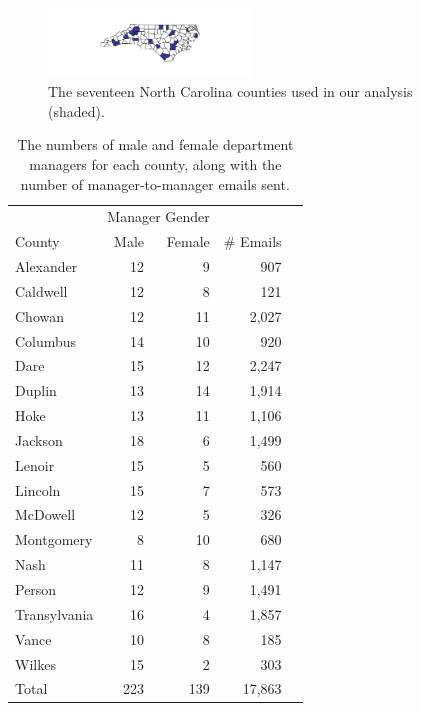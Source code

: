 \documentclass{pnastwo}
\begin{document}
\begin{article}
\begin{figure}
  \centering
  \caption{\label{fig:nc map}The seventeen North Carolina counties
    used in our analysis (shaded).} \centering
  \includegraphics[width=0.48\textwidth]{images/County_Map.pdf}
\end{figure}

\begin{table}
  \centering
  \begin{tabular}{lrrrr}
    \toprule
    & \multicolumn{2}{c}{Manager Gender} & \\
    \cmidrule{2-3}
    County & Male & Female & \# Emails  \\
    \midrule
    Alexander & 12 & 9 & 907   \\
    Caldwell & 12 & 8 & 121     \\
    Chowan & 12 & 11 & 2,027   \\
    Columbus & 14 & 10 & 920   \\
    Dare & 15 & 12 & 2,247    \\
    Duplin & 13 & 14 & 1,914    \\
    Hoke & 13 & 11 & 1,106  \\
    Jackson & 18 & 6 & 1,499    \\
    Lenoir & 15 & 5 & 560  \\
    Lincoln & 15 & 7 & 573   \\
    McDowell & 12 & 5 & 326   \\
    Montgomery & 8 & 10 & 680   \\
    Nash & 11 & 8 & 1,147  \\
    Person & 12 & 9 & 1,491   \\
    Transylvania & 16 & 4 & 1,857  \\
    Vance & 10 & 8 & 185   \\
    Wilkes & 15 & 2 & 303   \\
    \midrule
    Total & 223 & 139 & 17,863 \\
    \bottomrule
  \end{tabular}
  \caption{\label{tab:county aggregate stats} The numbers of male and
    female department managers for each county, along with the number
    of manager-to-manager emails sent.}
\end{table}


\end{article}
\end{document}
